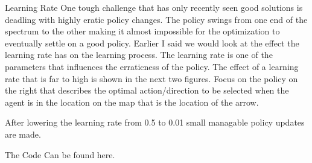 Learning Rate
One tough challenge that has only recently seen good solutions is deadling with highly eratic policy changes. The policy swings from one end of the spectrum to the other making it almost impossible for the optimization to eventually settle on a good policy.
Earlier I said we would look at the effect the learning rate has on the learning process. The learning rate is one of the parameters that influences the erraticness of the policy. The effect of a learning rate that is far to high is shown in the next two figures. Focus on the policy on the right that describes the optimal action/direction to be selected when the agent is in the location on the map that is the location of the arrow.


After lowering the learning rate from 0.5 to 0.01 small managable policy updates are made.

The Code 
Can be found here.

